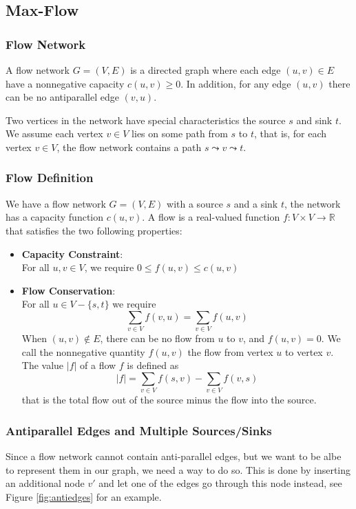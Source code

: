 \subsection{Max-Flow}
\subsubsection{Flow Network}
A flow network $G=(V,E)$ is a directed graph where each edge $(u,v) \in E$ have
a nonnegative capacity $c(u,v) \geq 0$. In addition, for any edge $(u,v)$ there
can be no antiparallel edge $(v,u)$.

Two vertices in the network have special characteristics the source $s$ and sink
$t$. We assume each vertex $v \in V$ lies on some path from $s$ to $t$, that is,
for each vertex $v \in V$, the flow network contains a path $s \leadsto v
\leadsto t$.

\subsubsection{Flow Definition}
We have a flow network $G = (V,E)$ with a source $s$ and a sink $t$, the network
has a capacity function $c(u,v)$. A flow is a real-valued function $f : V \times
V \rightarrow \mathbb{R}$ that satisfies the two following properties:
\begin{itemize}
  \item \textbf{Capacity Constraint}:\\
    For all $u,v \in V$, we require $0 \leq f(u,v) \leq c(u,v)$
  \item \textbf{Flow Conservation}:\\
    For all $u \in V - \{s,t\}$ we require
    \[
      \sum_{v\in V}f(v,u) = \sum_{v\in V}f(u,v)
    \]
    When $(u,v) \notin E$, there can be no flow from $u$ to $v$, and $f(u,v) =
    0$. We call the nonnegative quantity $f(u,v)$ the flow from vertex $u$ to
    vertex $v$. The value $|f|$ of a flow $f$ is defined as
    \[
      |f| = \sum_{v \in V} f(s,v) - \sum_{v \in V} f(v,s)
    \]
    that is the total flow out of the source minus the flow into the source.
\end{itemize}

\subsubsection{Antiparallel Edges and Multiple Sources/Sinks}
Since a flow network cannot contain anti-parallel edges, but we want to be albe
to represent them in our graph, we need a way to do so. This is done by
inserting an additional node $v'$ and let one of the edges go through this node
instead, see Figure \ref{fig:antiedges} for an example.

